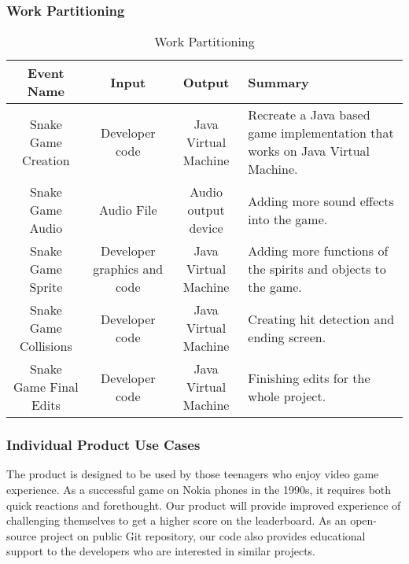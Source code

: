 \documentclass[12pt, titlepage]{article}
\begin{document}
\subsubsection{Work Partitioning}
	\begin{table}[H]
	\caption{Work Partitioning}
        \begin{adjustwidth}{-2.75cm}{}
    \begin{tabular}{|c|c|c|p{5cm}|}
    \hline
    Event Name & Input & Output & Summary\\
    \hline
    Snake Game Creation & Developer code & Java Virtual Machine & Recreate a Java based game implementation that works on Java Virtual Machine.\\
    \hline
    Snake Game Audio & Audio File & Audio output device & Adding more sound effects into the game.\\
    \hline
    Snake Game Sprite & Developer graphics and code & Java Virtual Machine & Adding more functions of the spirits and objects to the game.\\
    \hline
    Snake Game Collisions & Developer code & Java Virtual Machine & Creating hit detection and ending screen. \\
    \hline
    Snake Game Final Edits & Developer code & Java Virtual Machine & Finishing edits for the whole project.\\
    \hline
    \end{tabular}
	    \end{adjustwidth}
	\end{table}
\subsubsection{Individual Product Use Cases}
The product is designed to be used by those teenagers who enjoy video game experience. As a successful game on Nokia phones in the 1990s, it requires both quick reactions and forethought. Our product will provide improved experience of challenging themselves to get a higher score on the leaderboard. As an open-source project on public Git repository, our code also provides educational support to the developers who are interested in similar projects.
\end{document}

